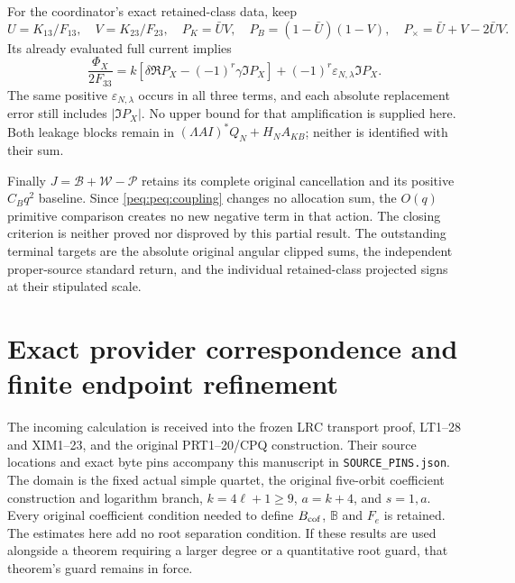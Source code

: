 For the coordinator's exact retained-class data, keep
\[
 U=K_{13}/F_{13},\quad V=K_{23}/F_{23},\quad
 P_K=\bar UV,\quad P_B=(1-\bar U)(1-V),\quad
 P_\times=\bar U+V-2\bar UV.
\]
Its already evaluated full current implies
\[
 \frac{\Phi_X}{2F_{33}}
 =k[\delta\Re P_X-(-1)^r\gamma\Im P_X]
       +(-1)^r\varepsilon_{N,\lambda}\Im P_X.
\]
The same positive $\varepsilon_{N,\lambda}$ occurs in all three terms, and each absolute replacement error still includes $|\Im P_X|$. No upper bound for that amplification is supplied here. Both leakage blocks remain in
$(\Lambda AI)^*Q_N+H_NA_{KB}$; neither is identified with their sum.

Finally $J=\mathcal B+\mathcal W-\mathcal P$ retains its complete original cancellation and its positive $C_Bq^2$ baseline. Since \eqref{peq:peq:coupling} changes no allocation sum, the $O(q)$ primitive comparison creates no new negative term in that action. The closing criterion is neither proved nor disproved by this partial result. The outstanding terminal targets are the absolute original angular clipped sums, the independent proper-source standard return, and the individual retained-class projected signs at their stipulated scale.

\section{Exact provider correspondence and finite endpoint refinement}
\label{peq:peq:intake}

The incoming calculation is received into the frozen LRC transport
proof, LT1--28 and XIM1--23, and the original PRT1--20/CPQ
construction. Their source locations and exact byte pins accompany this
manuscript in \texttt{SOURCE\_PINS.json}. The domain is the fixed actual
simple quartet, the original five-orbit coefficient construction and
logarithm branch, $k=4\ell+1\ge9$, $a=k+4$, and $s=1,a$.
Every original coefficient condition needed to define $B_{\rm cof}$,
$\mathbb B$ and $F_e$ is retained. The estimates here add no root
separation condition. If these results are used alongside a theorem
requiring a larger degree or a quantitative root guard, that theorem's
guard remains in force.

